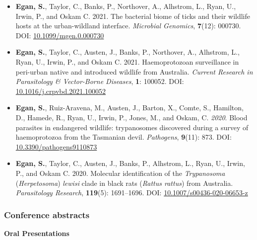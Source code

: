 \documentclass[a4paper, nobind]{templates/ociamthesis}
\providecommand{\tightlist}{%
  \setlength{\itemsep}{0pt}\setlength{\parskip}{0pt}}
\begin{document}
\begin{itemize}
\tightlist
\item
  \textbf{Egan, S.}, Taylor, C., Banks, P., Northover, A., Alhstrom, L., Ryan, U., Irwin, P., and Oskam C. 2021. The bacterial biome of ticks and their wildlife hosts at the urban-wildland interface. \emph{Microbial Genomics}, \textbf{7}(12): 000730. DOI: \href{https://doi.org/10.1099/mgen.0.000730}{10.1099/mgen.0.000730}
\item
  \textbf{Egan, S.}, Taylor, C., Austen, J., Banks, P., Northover, A., Alhstrom, L., Ryan, U., Irwin, P., and Oskam C. 2021. Haemoprotozoan surveillance in peri-urban native and introduced wildlife from Australia. \emph{Current Research in Parasitology \& Vector-Borne Diseases}, \textbf{1}: 100052. DOI: \href{https://doi.org/10.1016/j.crpvbd.2021.100052}{10.1016/j.crpvbd.2021.100052}
\item
  \textbf{Egan, S.}, Ruiz-Aravena, M., Austen, J., Barton, X., Comte, S., Hamilton, D., Hamede, R., Ryan, U., Irwin, P., Jones, M., and Oskam, C. \emph{2020}. Blood parasites in endangered wildlife: trypanosomes discovered during a survey of haemoprotozoa from the Tasmanian devil. \emph{Pathogens}, \textbf{9}(11): 873. DOI: \href{https://doi.org/10.3390/pathogens9110873}{10.3390/pathogens9110873}
\item
  \textbf{Egan, S.}, Taylor, C., Austen, J., Banks, P., Alhstrom, L., Ryan, U., Irwin, P., and Oskam C. 2020. Molecular identification of the \emph{Trypanosoma} (\emph{Herpetosoma}) \emph{lewisi} clade in black rats (\emph{Rattus rattus}) from Australia. \emph{Parasitology Research}, \textbf{119}(5): 1691--1696. DOI: \href{https://doi.org/10.1007/s00436-020-06653-z}{10.1007/s00436-020-06653-z}
\end{itemize}

\hypertarget{conference-abstracts}{%
\subsubsection*{Conference abstracts}\label{conference-abstracts}}

\textbf{Oral Presentations}
\end{document}
